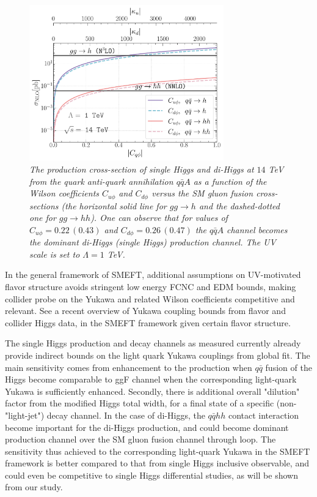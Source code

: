 \begin{figure}[t]
	\centering
	\includegraphics[width=0.75\textwidth]{fig/pph_hh_14Tev.pdf}
	\caption{\it The production cross-section of single Higgs and di-Higgs at $14$ TeV from the quark anti-quark annihilation $q\bar{q}A$ as a function of the Wilson coefficients $C_{u\phi}$ and $C_{d\phi}$ versus the SM gluon fusion cross-sections (the horizontal solid line for $gg \to h$ and the dashed-dotted one for $gg \to hh$). One can observe that for values of $C_{u\phi}=0.22\, (0.43)$ and $C_{d\phi}=0.26\, (0.47)$ the $q\bar{q}A$ channel becomes the dominant di-Higgs (single Higgs) production channel. The UV scale is set to $\Lambda = 1$ TeV. }
	\label{fig:pphhvsh}
\end{figure} 

In the general framework of SMEFT, additional assumptions on UV-motivated flavor structure avoids stringent low energy FCNC and EDM bounds, making collider probe on the Yukawa and related Wilson coefficients competitive and relevant. See a recent overview of Yukawa coupling bounds from flavor and collider Higgs data, in the SMEFT framework given certain flavor structure. \cite{Alonso-Gonzalez:2021tpo}

The single Higgs production and decay channels as measured currently already provide indirect bounds on the light quark Yukawa couplings from global fit. The main sensitivity comes from enhancement to the production when $q\bar q$ fusion of the Higgs become comparable to ggF channel when the corresponding light-quark Yukawa is sufficiently enhanced. Secondly, there is additional overall "dilution" factor from the modified Higgs total width, for a final state of a specific (non-"light-jet") decay channel.
In the case of di-Higgs, the $q\bar q hh$ contact interaction become important for the di-Higgs production, and could become dominant production channel over the SM gluon fusion channel through loop. The sensitivity thus achieved to the corresponding light-quark Yukawa in the SMEFT framework is better compared to that from single Higgs inclusive observable, and could even be competitive to single Higgs differential studies, as will be shown from our study.

